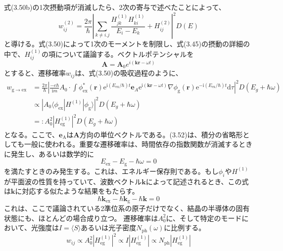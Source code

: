 \documentclass[11pt,a4j,uplatex]{jsarticle}
\begin{document}
式(3.50b)の1次摂動項が消滅したら、2次の寄与で述べたことによって、
\begin{equation}
  w_{ij}^{(2)}=\frac{2\pi}{\hbar}\left|\sum_{k\not=i.j}\frac{H_{jk}^{(1)}H_{ki}^{(1)}}{E_i-E_k}+H_{ij}^{(2)}\right|^2D(E)\tag{3.51}
\end{equation}
と導ける。式(3.50)によって1次のモーメントを制限し、式(3.45)の摂動の詳細の中で、$H_{ij}^{(1)}$の項について議論する。ベクトルポテンシャルを
\begin{equation}
  \bm{A}=\bm{A}_{\mathrm{0}}e^{i(\bm{kr}-\omega t)}\tag{3.52a}
\end{equation}
とすると、遷移確率$w_{ij}$は、式(3.50)の吸収過程のように、
\begin{equation}\tag{3.52b}
  \begin{split}
    w_{\mathrm{g\to ex}}&=\frac{2\pi}{\hbar}\left|\frac{-e\hbar}{\mathrm{i}m}A_0\cdot \int\phi_{\mathrm{ex}}^*(\bm{r})\mathrm{e}^{\mathrm{i}(E_\mathrm{ex}/\hbar)t}\bm{e}_A\mathrm{e}^{\mathrm{i}(\bm{kr}-\omega t)}\nabla\phi_{\mathrm{g}}(\bm{r})\mathrm{e}^{-\mathrm{i}(E_\mathrm{ex}/\hbar)t}\mathrm{d}\tau\right|^2D(E_{g}+\hbar\omega)\\
    &\propto\left|A_0\langle\phi_{\mathrm{ex}}|H^{(1)}|\phi_{\mathrm{g}}\rangle\right|^2D(E_{g}+\hbar\omega)\\
    &=:A_0^2\left|H_{\mathrm{eg}}^{(1)}\right|^2D(E_{g}+\hbar\omega)
  \end{split}
\end{equation}
となる。ここで、$\bm{e}_{\mathrm{A}}$は$\bm{A}$方向の単位ベクトルである。(3.52)は、積分の省略形としても一般に使われる。重要な遷移確率は、時間依存の指数関数が消滅するときに発生し、あるいは数学的に
\begin{equation}
  E_{\mathrm{ex}}-E_{\mathrm{g}}-\hbar\omega=0\tag{3.53a}
\end{equation}
を満たすときのみ発生する。これは、エネルギー保存則である。もし$\phi_i$や$H^{(1)}$が平面波の性質を持っていて、波数ベクトル$\bm{k}$によって記述されるとき、この式は$\bm{k}$に対応する似たような結果をもたらす。
\begin{equation}
  \hbar\bm{k}_{\mathrm{ex}}-\hbar\bm{k}_{\mathrm{g}}-\hbar\bm{k}=0\tag{3.53b}
\end{equation}
これは、ここで議論されている2準位系の原子だけでなく、結晶の半導体の固有状態にも、ほとんどの場合成り立つ。
遷移確率は$A_0^2$に、そして特定のモードにおいて、光強度は$I=\langle S\rangle$あるいは光子密度$N_{\mathrm{ph}}(\omega)$に比例する。
\begin{equation}
  w_{ij}\propto A_0^2\left|H_{\mathrm{eg}}^{(1)}\right|^2\propto I\left|H_{\mathrm{eg}}^{(1)}\right|\propto N_{\mathrm{ph}}\left|H_{\mathrm{eg}}^{(1)}\right|\tag{3.54}
\end{equation}
\end{document}
